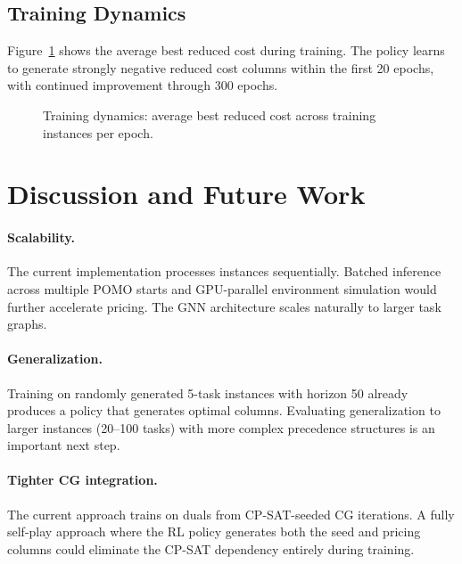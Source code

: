 \documentclass[11pt]{article}
\begin{document}
\subsection{Training Dynamics}

Figure~\ref{fig:training} shows the average best reduced cost during training.
The policy learns to generate strongly negative reduced cost columns within the first 20 epochs, with continued improvement through 300 epochs.

\begin{figure}[h]
\centering
\caption{Training dynamics: average best reduced cost across training instances per epoch.}
\label{fig:training}
\end{figure}

\section{Discussion and Future Work}\label{sec:discussion}

\paragraph{Scalability.}
The current implementation processes instances sequentially.
Batched inference across multiple POMO starts and GPU-parallel environment simulation would further accelerate pricing.
The GNN architecture scales naturally to larger task graphs.

\paragraph{Generalization.}
Training on randomly generated 5-task instances with horizon 50 already produces a policy that generates optimal columns.
Evaluating generalization to larger instances (20--100 tasks) with more complex precedence structures is an important next step.

\paragraph{Tighter CG integration.}
The current approach trains on duals from CP-SAT-seeded CG iterations.
A fully self-play approach where the RL policy generates both the seed and pricing columns could eliminate the CP-SAT dependency entirely during training.
\end{document}
